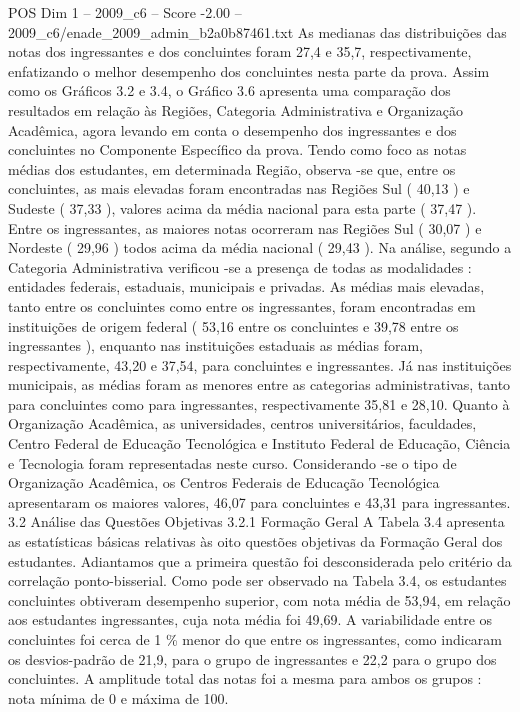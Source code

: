 \begin{textsample}{POS Dim 1 – 2009\_c6 – Score -2.00 – 2009\_c6/enade\_2009\_admin\_b2a0b87461.txt}
As medianas das distribuições das notas dos ingressantes e dos concluintes foram 27,4 e 35,7, respectivamente, enfatizando o melhor desempenho dos concluintes nesta parte da prova.
Assim como os Gráficos 3.2 e 3.4, o Gráfico 3.6 apresenta uma comparação dos resultados em relação às Regiões, Categoria Administrativa e Organização Acadêmica, agora levando em conta o desempenho dos ingressantes e dos concluintes no Componente Específico da prova.
Tendo como foco as notas médias dos estudantes, em determinada Região, observa -se que, entre os concluintes, as mais elevadas foram encontradas nas Regiões Sul ( 40,13 ) e Sudeste ( 37,33 ), valores acima da média nacional para esta parte ( 37,47 ).
Entre os ingressantes, as maiores notas ocorreram nas Regiões Sul ( 30,07 ) e Nordeste ( 29,96 ) todos acima da média nacional ( 29,43 ).
Na análise, segundo a Categoria Administrativa verificou -se a presença de todas as modalidades : entidades federais, estaduais, municipais e privadas.
As médias mais elevadas, tanto entre os concluintes como entre os ingressantes, foram encontradas em instituições de origem federal ( 53,16 entre os concluintes e 39,78 entre os ingressantes ), enquanto nas instituições estaduais as médias foram, respectivamente, 43,20 e 37,54, para concluintes e ingressantes.
Já nas instituições municipais, as médias foram as menores entre as categorias administrativas, tanto para concluintes como para ingressantes, respectivamente 35,81 e 28,10.
Quanto à Organização Acadêmica, as universidades, centros universitários, faculdades, Centro Federal de Educação Tecnológica e Instituto Federal de Educação, Ciência e Tecnologia foram representadas neste curso.
Considerando -se o tipo de Organização Acadêmica, os Centros Federais de Educação Tecnológica apresentaram os maiores valores, 46,07 para concluintes e 43,31 para ingressantes. 3.2 Análise das Questões Objetivas 3.2.1 Formação Geral A Tabela 3.4 apresenta as estatísticas básicas relativas às oito questões objetivas da Formação Geral dos estudantes.
Adiantamos que a primeira questão foi desconsiderada pelo critério da correlação ponto-bisserial.
Como pode ser observado na Tabela 3.4, os estudantes concluintes obtiveram desempenho superior, com nota média de 53,94, em relação aos estudantes ingressantes, cuja nota média foi 49,69.
A variabilidade entre os concluintes foi cerca de 1 \% menor do que entre os ingressantes, como indicaram os desvios-padrão de 21,9, para o grupo de ingressantes e 22,2 para o grupo dos concluintes.
A amplitude total das notas foi a mesma para ambos os grupos : nota mínima de 0 e máxima de 100.

\end{textsample}
